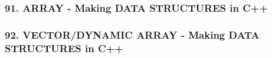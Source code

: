 \documentclass[11pt]{article}
\begin{document}
\hypertarget{array---making-data-structures-in-c}{%
\subsubsection{91. ARRAY - Making DATA STRUCTURES in
C++}\label{array---making-data-structures-in-c}}

\hypertarget{vectordynamic-array---making-data-structures-in-c}{%
\subsubsection{92. VECTOR/DYNAMIC ARRAY - Making DATA STRUCTURES in
C++}\label{vectordynamic-array---making-data-structures-in-c}}


    
    
    
\end{document}
